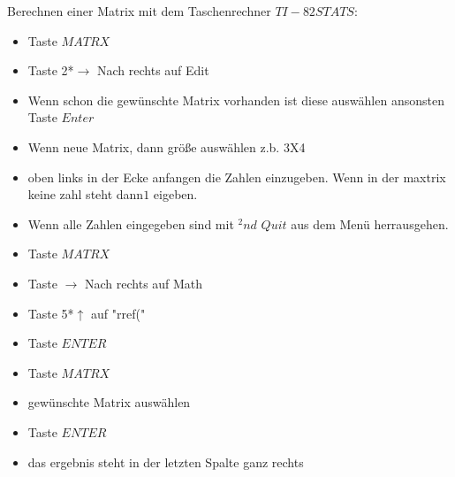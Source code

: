 \break
Berechnen einer Matrix mit dem Taschenrechner $TI-82STATS$:\\
\begin{itemize}
    \item Taste $MATRX$
    \item Taste 2*$\rightarrow$ Nach rechts auf Edit
    \item Wenn schon die gewünschte Matrix vorhanden ist diese auswählen ansonsten Taste $Enter$
    \item Wenn neue Matrix, dann größe auswählen z.b. 3X4
    \item oben links in der Ecke anfangen die Zahlen einzugeben. Wenn in der maxtrix keine zahl steht dann$1$ eigeben.
    \item Wenn alle Zahlen eingegeben sind mit $^2nd$ $Quit$ aus dem Menü herrausgehen.
    \item Taste  $MATRX$
    \item Taste $\rightarrow$ Nach rechts auf Math
    \item Taste 5*$\uparrow$ auf "rref("
    \item Taste $ENTER$
    \item Taste $MATRX$
    \item gewünschte Matrix auswählen
    \item Taste $ENTER$
    \item das ergebnis steht in der letzten Spalte ganz rechts
\end{itemize}
